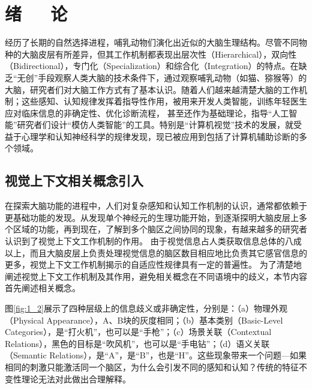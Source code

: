 \chapter{绪~~~论} %
\label{c1}

经历了长期的自然选择进程，哺乳动物们演化出近似的大脑生理结构。尽管不同物种的大脑皮层有所差异，但其工作机制都表现出{层次性}（Hierarchical），{双向性}（Bidirectional），{专门化}（Specialization）和{综合化}（Integration）的特点。在缺乏“无创”手段观察人类大脑的技术条件下，通过观察哺乳动物（如猫、猕猴等）的大脑，研究者们对大脑工作方式有了基本认识。随着人们越来越清楚大脑的工作机制；这些感知、认知规律发挥着指导性作用，被用来开发人类智能，训练年轻医生应对临床信息的非确定性、优化诊断流程，
甚至还作为基础理论，指导“人工智能”研究者们设计“模仿人类智能”的工具。特别是“计算机视觉”技术的发展，就受益于心理学和认知神经科学的规律发现，现已被应用到包括了计算机辅助诊断的多个领域。


\section{视觉上下文相关概念引入} %
\label{c1:s1}
在探索大脑功能的进程中，人们对复杂感知和认知工作机制的认识，通常都依赖于更基础功能的发现。从发现单个神经元的生理功能开始，到逐渐探明大脑皮层上多个区域的功能，再到现在，了解到多个脑区之间协同的现象，有越来越多的研究者认识到了视觉上下文工作机制的作用。
由于视觉信息占人类获取信息总体的八成以上，而且大脑皮层上负责处理视觉信息的脑区数目相应地比负责其它感官信息的更多，视觉上下文工作机制揭示的自适应性规律具有一定的普遍性。
为了清楚地阐述视觉上下文工作机制及其作用，避免相关概念在不同语境中的歧义，本节内容首先阐述相关概念。

图\ref{fig:1_2}展示了四种层级上的信息歧义或非确定性，分别是：（a）物理外观（Physical Appearance），A、B块的灰度相同\protect\footnotemark；（b）基本类别（Basic-Level Categories），是“打火机”，也可以是“手枪”\protect\footnotemark；（c）场景关联（Contextual Relations），黑色的目标是“吹风机”，也可以是“手电钻”\protect\footnotemark；（d）语义关联（Semantic Relations），是“A”，是“B”，也是“H”\protect\footnotemark。这些现象带来一个问题---如果相同的刺激只能激活同一个脑区，为什么会引发不同的感知和认知？传统的特征不变性理论无法对此做出合理解释。

